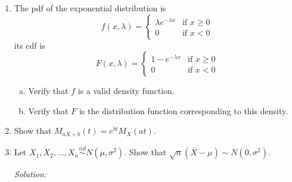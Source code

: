 \documentclass[12pt]{article}
\newif\ifsln
\newcommand{\E}{\mathbb{E}}
\begin{document}
\begin{enumerate}[1.]
\ifsln
\textit{Solution:}\\
$\E[(X - \mu)^{2}] = \E[X^{2} - 2\mu X + \mu^{2}] = \E[X^{2}] - 2\mu \E[X] + \mu^{2} = \E[X^{2}] - 2\mu^{2} + \mu^{2} = \E[X^{2}] - \mu^{2} = \E[X^{2}] - \E[X]^{2}$.
\fi

\item The pdf of the exponential distribution is 
\[f(x, \lambda) = \begin{cases}\lambda e^{-\lambda x} & \text{if } x\geq 0\\ 0 & \text{if } x < 0 \end{cases}\]
its cdf is
\[F(x, \lambda) = \begin{cases}1 - e^{-\lambda x} & \text{if } x\geq 0\\ 0 & \text{if } x < 0 \end{cases}\]

\begin{enumerate}[a)]
	\item Verify that $f$ is a valid density function.
	\item Verify that $F$ is the distribution function corresponding to this density.
\end{enumerate}

\ifsln
\textit{Solution:}\\
a) $\int_{0}^{\infty} \lambda e^{-\lambda x} \mathrm{d}x = \left[-e^{-\lambda x}\right]_{0}^{1} = \lim_{x\to\infty} -e^{-\lambda x} - - e^{-\lambda \cdot 0} = 0 - -1 = 1 $. Where the limit goes to zero since $\lambda > 0$.\\

b) $F^{\prime}(x; \lambda) = \frac{\mathrm{d}}{\mathrm{d}x} [1 - e^{-\lambda x}] = 0 + \lambda e^{-\lambda x} = f(x; \lambda)$.
\fi
\item Show that $M_{aX + b}(t) = e^{bt}M_{X}(at)$.

\ifsln
\textit{Solution:}\\
$M_{aX+b}(t) = \E[e^{t(aX+b})] = \E[e^{(at)X}e^{bt}] = e^{bt}\E[e^{(at)X}] = e^{bt} M_{X}(at)$.
\fi

\item Let $X_{1}, X_{2}, \dots, X_{n} \overset{iid}{\sim} N(\mu, \sigma^{2})$. Show that $\sqrt{n}(\bar{X} - \mu) \sim N(0, \sigma^{2})$.

\ifsln
\textit{Solution:}\\


\end{enumerate}
\end{document}
